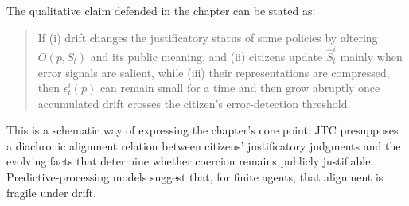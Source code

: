 \documentclass[12pt]{report}
\begin{document}
The qualitative claim defended in the chapter can be stated as:

\begin{quote}
If (i) drift changes the justificatory status of some policies by altering $O(p,S_t)$ and its public meaning, and (ii) citizens update $\widehat{S}^i_t$ mainly when error signals are salient, while (iii) their representations are compressed, then $\epsilon^i_t(p)$ can remain small for a time and then grow abruptly once accumulated drift crosses the citizen's error-detection threshold.
\end{quote}

This is a schematic way of expressing the chapter's core point: JTC presupposes a diachronic alignment relation between citizens' justificatory judgments and the evolving facts that determine whether coercion remains publicly justifiable. Predictive-processing models suggest that, for finite agents, that alignment is fragile under drift.


\printbibliography
\end{document}
